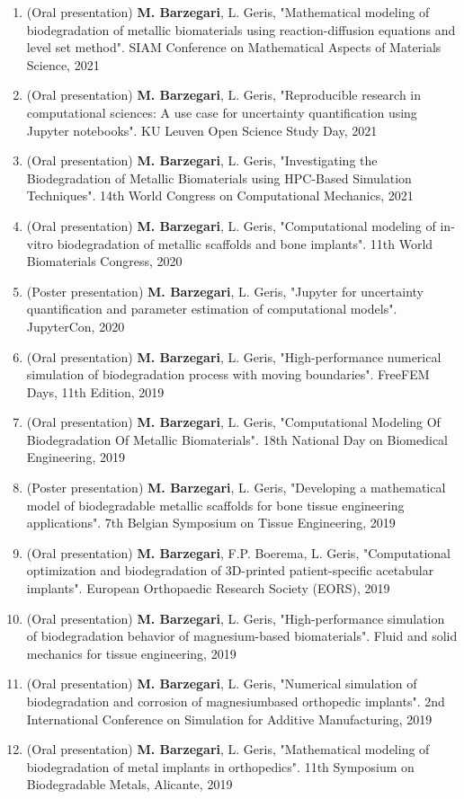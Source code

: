 \begin{enumerate}
\item
(Oral presentation)
\textbf{M. Barzegari}, L. Geris, "Mathematical modeling of biodegradation of metallic biomaterials using reaction-diffusion equations and level set method". SIAM Conference on Mathematical Aspects of Materials Science, 2021
\item
(Oral presentation)
\textbf{M. Barzegari}, L. Geris, "Reproducible research in computational sciences: A use case for uncertainty quantification using Jupyter notebooks". KU Leuven Open Science Study Day, 2021
\item
(Oral presentation)
\textbf{M. Barzegari}, L. Geris, "Investigating the Biodegradation of Metallic Biomaterials using HPC-Based Simulation Techniques". 14th World Congress on Computational Mechanics, 2021
\item
(Oral presentation) 
\textbf{M. Barzegari}, L. Geris, "Computational modeling of in-vitro biodegradation of metallic scaffolds and bone implants". 11th World Biomaterials Congress, 2020
\item
(Poster presentation) 
\textbf{M. Barzegari}, L. Geris, "Jupyter for uncertainty quantification and parameter estimation of computational models". JupyterCon, 2020
\item
(Oral presentation) 
\textbf{M. Barzegari}, L. Geris, "High-performance numerical simulation of biodegradation process with moving boundaries". FreeFEM Days, 11th Edition, 2019
\item
(Oral presentation) 
\textbf{M. Barzegari}, L. Geris, "Computational Modeling Of Biodegradation Of Metallic Biomaterials". 18th National Day on Biomedical Engineering, 2019
\item
(Poster presentation) 
\textbf{M. Barzegari}, L. Geris, "Developing a mathematical model of biodegradable metallic scaffolds for bone tissue engineering applications". 7th Belgian Symposium on Tissue Engineering, 2019
\item
(Oral presentation) 
\textbf{M. Barzegari}, F.P. Boerema, L. Geris, "Computational optimization and biodegradation of 3D-printed patient-specific acetabular implants". European Orthopaedic Research Society (EORS), 2019
\item
(Oral presentation) 
\textbf{M. Barzegari}, L. Geris, "High-performance simulation of biodegradation behavior of magnesium-based biomaterials". Fluid and solid mechanics for tissue engineering, 2019
\item
(Oral presentation) 
\textbf{M. Barzegari}, L. Geris, "Numerical simulation of biodegradation and corrosion of magnesiumbased orthopedic implants". 2nd International Conference on Simulation for Additive Manufacturing, 2019
\item
(Oral presentation) 
\textbf{M. Barzegari}, L. Geris, "Mathematical modeling of biodegradation of metal implants in orthopedics". 11th Symposium on Biodegradable Metals, Alicante, 2019
\end{enumerate}


